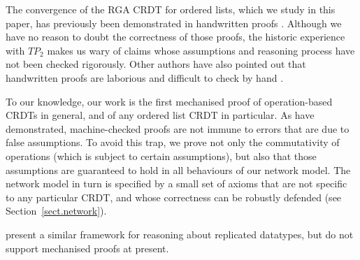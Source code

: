 The convergence of the RGA CRDT for ordered lists, which we study in this paper, has previously been
demonstrated in handwritten proofs \cite{Attiya:2016kh,Kleppmann:2016ve,Roh:2009ws}. Although we
have no reason to doubt the correctness of those proofs, the historic experience with
$\mathit{TP}_2$ makes us wary of claims whose assumptions and reasoning process have not been
checked rigorously. Other authors have also pointed out that handwritten proofs are laborious and
difficult to check by hand \cite{Li:2008hw,Li:2005jq}.

To our knowledge, our work is the first mechanised proof of operation-based CRDTs in general, and of
any ordered list CRDT in particular. As \citet{Oster:2005vi} have demonstrated, machine-checked
proofs are not immune to errors that are due to false assumptions. To avoid this trap, we prove not
only the commutativity of operations (which is subject to certain assumptions), but also that those
assumptions are guaranteed to hold in all behaviours of our network model. The network model in turn
is specified by a small set of axioms that are not specific to any particular CRDT, and whose
correctness can be robustly defended (see Section~\ref{sect.network}).

\citet{Burckhardt:2014ft} present a similar framework for reasoning about replicated datatypes, but
do not support mechanised proofs at present.
